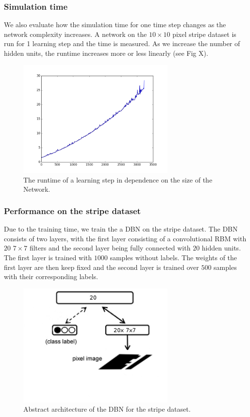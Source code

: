 \subsubsection{Simulation time}

We also evaluate how the simulation time for one time step changes as the network complexity increases.
A network on the $10 \times 10$ pixel stripe dataset is run for 1 learning step and the time is measured.
As we increase the number of hidden units, the runtime increases more or less linearly (see Fig X).

\begin{figure}
	\centering
    	\includegraphics[width=0.7\textwidth]{imgs/runtime-1.png} 
    \caption{The runtime of a learning step in dependence on the size of the Network.}
	\label{fig:rbmw}
\end{figure}


\subsubsection{Performance on the stripe dataset}

Due to the training time, we train the a DBN on the stripe dataset. 
The DBN consists of two layers, with the first layer consisting of a convolutional RBM with $20$ $7 \times 7$ filters and the second layer being fully connected with $20$ hidden units.
The first layer is trained with $1000$ samples without labels.
The weights of the first layer are then keep fixed and the second layer is trained over $500$ samples with their corresponding labels.

\begin{figure}[h!]
	\centering
    	\includegraphics[width=0.7\textwidth]{imgs/dbn_stripe.png} 
    \caption{Abstract architecture of the DBN for the stripe dataset.}
	\label{fig:rbmw}
\end{figure}


